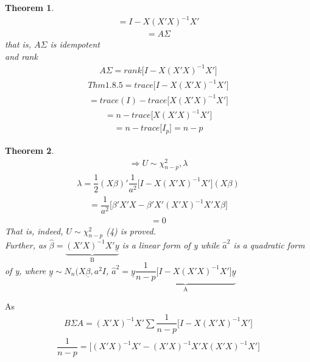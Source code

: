 \documentclass[12pt]{article}
\newtheorem{theorem}{\bf{Theorem}}[section]
\numberwithin{equation}{section}
\begin{document}
\begin{theorem}
\begin{eqnarray*}
= I-X(X'X)^{-1}X'
\end{eqnarray*}
\begin{eqnarray*}
 = A\Sigma
\end{eqnarray*}
that is, $A\Sigma$ is idempotent\\
and rank 
\begin{eqnarray*}
A\Sigma = rank \big[I-X(X'X)^{-1}X' \big]
\end{eqnarray*}
\begin{eqnarray*}
Thm 1.8.5 = trace \big[I-X(X'X)^{-1}X' \big]
\end{eqnarray*}
\begin{eqnarray*}
= trace(I)-trace\big[X(X'X)^{-1}X' \big]
\end{eqnarray*}
\begin{eqnarray*}
= n-trace\big[X(X'X)^{-1}X' \big]
\end{eqnarray*}
\begin{eqnarray*}
= n-trace\big[I_{p}\big] = n-p
\end{eqnarray*}
\end{theorem}
\begin{theorem}
\begin{eqnarray*}
\Longrightarrow U \sim \chi_{n-p}^{2}, \lambda
\end{eqnarray*}
\begin{eqnarray*}
\lambda = \dfrac{1}{2}(X\beta)'\dfrac{1}{a^{2}}\big[I-X(X'X)^{-1}X' \big](X\beta)
\end{eqnarray*}
\begin{eqnarray*}
= \dfrac{1}{a^{2}}\big[\beta'X'X -\beta' X'(X'X)^{-1}X'X\beta\big]
\end{eqnarray*}
\begin{eqnarray*}
= 0
\end{eqnarray*}
That is, indeed, $U \sim \chi_{n-p}^{2}$ (4) is proved.\\Further, as $\hat{\beta} = \underbrace{(X'X)^{-1}X'\underline{y}}_{\text{B}}$ is a linear form of \underline{y} while $\hat{a}^{2}$ is a quadratic form of \underline{y}, where $\underline{y} \sim N_{n}(X\underline{\beta}, a^{2}I$, $\hat{a}^{2} = \underline{y}\underbrace{\dfrac{1}{n-p}\big[I-X(X'X)^{-1}X' \big]\underline{y}}_{
\text{A}}$ 
\end{theorem}
As 
\begin{eqnarray*}
B \Sigma A = (X'X)^{-1}X'\sum\dfrac{1}{n-p}\big[I-X(X'X)^{-1}X'\big]
\end{eqnarray*}
\begin{eqnarray*}
\dfrac{1}{n-p} = \big[(X'X)^{-1}X'-(X'X)^{-1}X'X(X'X)^{-1}X'\big]
\end{eqnarray*}
\end{document}
